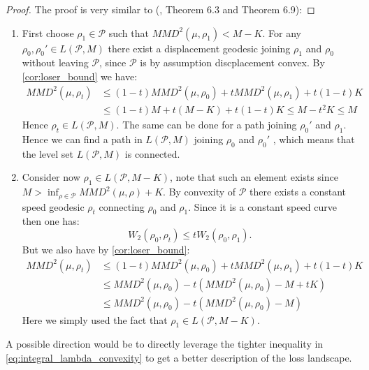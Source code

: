 %
\begin{proof}
The proof is very similar to (\cite{Bottou:2017}, Theorem 6.3 and
Theorem 6.9): 
\end{proof}
\begin{enumerate}
\item First choose $\rho_{1}\in\mathcal{P}$ such that $MMD^{2}(\mu,\rho_{1})<M-K$.
For any $\rho_{0},\rho_{0}'\in L(\mathcal{P},M)$ there exist a displacement
geodesic joining $\rho_{1}$ and $\rho_{0}$ without leaving $\mathcal{P}$,
since $\mathcal{P}$ is by assumption discplacement convex. By \ref{cor:loser_bound}
we have:
\begin{align*}
MMD^{2}(\mu,\rho_{t}) & \leq(1-t)MMD^{2}(\mu,\rho_{0})+tMMD^{2}(\mu,\rho_{1})+t(1-t)K\\
 & \leq(1-t)M+t(M-K)+t(1-t)K\leq M-t^{2}K\leq M
\end{align*}
Hence $\rho_{t}\in L(\mathcal{P},M)$. The same can be done for a
path joining $\rho_{0}'$ and $\rho_{1}$. Hence we can find a path
in $L(\mathcal{P},M)$ joining $\rho_{0}$ and $\rho_{0}'$ , which
means that the level set $L(\mathcal{P},M)$ is connected.
\item Consider now $\rho_{1}\in L(\mathcal{P},M-K)$, note that such an
element exists since $M>\inf_{\rho\in\mathcal{P}}MMD^{2}(\mu,\rho)+K$.
By convexity of $\mathcal{P}$ there exists a constant speed geodesic
$\rho_{t}$ connecting $\rho_{0}$ and $\rho_{1}$. Since it is a
constant speed curve then one has:
\[
W_{2}(\rho_{0},\rho_{t})\leq tW_{2}(\rho_{0},\rho_{1}).
\]
But we also have by \ref{cor:loser_bound}:
\begin{align*}
MMD^{2}(\mu,\rho_{t}) & \leq(1-t)MMD^{2}(\mu,\rho_{0})+tMMD^{2}(\mu,\rho_{1})+t(1-t)K\\
 & \leq MMD^{2}(\mu,\rho_{0})-t(MMD^{2}(\mu,\rho_{0})-M+tK)\\
 & \leq MMD^{2}(\mu,\rho_{0})-t(MMD^{2}(\mu,\rho_{0})-M)
\end{align*}
Here we simply used the fact that $\rho_{1}\in L(\mathcal{P},M-K)$. 
\end{enumerate}
%

\begin{remark}
	A possible direction would be to directly leverage the tighter inequality in \ref{eq:integral_lambda_convexity} to get a better description of the loss landscape.
\end{remark}
